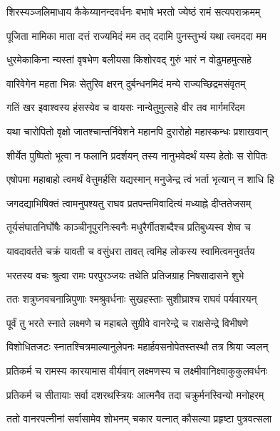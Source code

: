 
\twolineshloka
{शिरस्यञ्जलिमाधाय कैकेय्यानन्दवर्धनः}
{बभाषे भरतो ज्येष्ठं रामं सत्यपराक्रमम्} %

\twolineshloka
{पूजिता मामिका माता दत्तं राज्यमिदं मम}
{तद् ददामि पुनस्तुभ्यं यथा त्वमददा मम} %

\twolineshloka
{धुरमेकाकिना न्यस्तां वृषभेण बलीयसा}
{किशोरवद् गुरुं भारं न वोढुमहमुत्सहे} %

\twolineshloka
{वारिवेगेन महता भिन्नः सेतुरिव क्षरन्}
{दुर्बन्धनमिदं मन्ये राज्यच्छिद्रमसंवृतम्} %

\twolineshloka
{गतिं खर इवाश्वस्य हंसस्येव च वायसः}
{नान्वेतुमुत्सहे वीर तव मार्गमरिंदम} %

\twolineshloka
{यथा चारोपितो वृक्षो जातश्चान्तर्निवेशने}
{महानपि दुरारोहो महास्कन्धः प्रशाखवान्} %

\twolineshloka
{शीर्येत पुष्पितो भूत्वा न फलानि प्रदर्शयन्}
{तस्य नानुभवेदर्थं यस्य हेतोः स रोपितः} %

\twolineshloka
{एषोपमा महाबाहो त्वमर्थं वेत्तुमर्हसि}
{यद्यस्मान् मनुजेन्द्र त्वं भर्ता भृत्यान् न शाधि हि} %

\twolineshloka
{जगदद्याभिषिक्तं त्वामनुपश्यतु राघव}
{प्रतपन्तमिवादित्यं मध्याह्ने दीप्ततेजसम्} %

\twolineshloka
{तूर्यसंघातनिर्घोषैः काञ्चीनूपुरनिःस्वनैः}
{मधुरैर्गीतशब्दैश्च प्रतिबुध्यस्व शेष्व च} %

\twolineshloka
{यावदावर्तते चक्रं यावती च वसुंधरा}
{तावत् त्वमिह लोकस्य स्वामित्वमनुवर्तय} %

\twolineshloka
{भरतस्य वचः श्रुत्वा रामः परपुरञ्जयः}
{तथेति प्रतिजग्राह निषसादासने शुभे} %

\twolineshloka
{ततः शत्रुघ्नवचनान्निपुणाः श्मश्रुवर्धनाः}
{सुखहस्ताः सुशीघ्राश्च राघवं पर्यवारयन्} %

\twolineshloka
{पूर्वं तु भरते स्नाते लक्ष्मणे च महाबले}
{सुग्रीवे वानरेन्द्रे च राक्षसेन्द्रे विभीषणे} %

\twolineshloka
{विशोधितजटः स्नातश्चित्रमाल्यानुलेपनः}
{महार्हवसनोपेतस्तस्थौ तत्र श्रिया ज्वलन्} %

\twolineshloka
{प्रतिकर्म च रामस्य कारयामास वीर्यवान्}
{लक्ष्मणस्य च लक्ष्मीवानिक्ष्वाकुकुलवर्धनः} %

\twolineshloka
{प्रतिकर्म च सीतायाः सर्वा दशरथस्त्रियः}
{आत्मनैव तदा चक्रुर्मनस्विन्यो मनोहरम्} %

\twolineshloka
{ततो वानरपत्नीनां सर्वासामेव शोभनम्}
{चकार यत्नात् कौसल्या प्रहृष्टा पुत्रवत्सला} %


